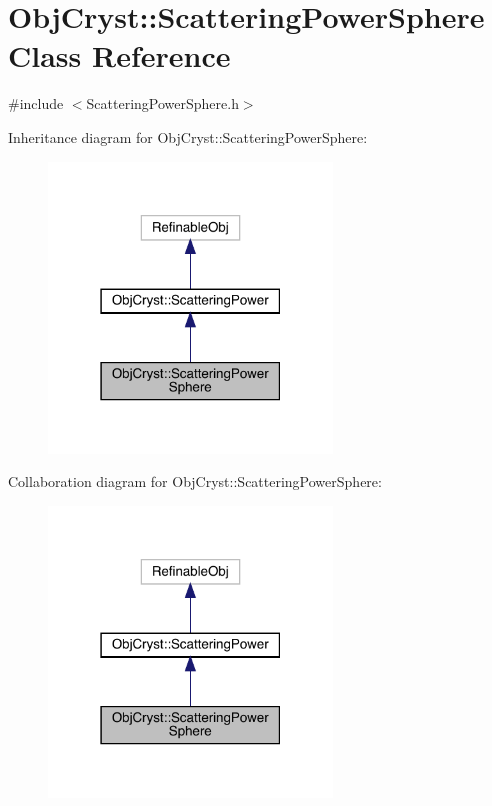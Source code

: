 \hypertarget{class_obj_cryst_1_1_scattering_power_sphere}{}\section{Obj\+Cryst\+::Scattering\+Power\+Sphere Class Reference}
\label{class_obj_cryst_1_1_scattering_power_sphere}


{\ttfamily \#include $<$Scattering\+Power\+Sphere.\+h$>$}



Inheritance diagram for Obj\+Cryst\+::Scattering\+Power\+Sphere\+:
\nopagebreak
\begin{figure}[H]
\begin{center}
\leavevmode
\includegraphics[width=214pt]{class_obj_cryst_1_1_scattering_power_sphere__inherit__graph}
\end{center}
\end{figure}


Collaboration diagram for Obj\+Cryst\+::Scattering\+Power\+Sphere\+:
\nopagebreak
\begin{figure}[H]
\begin{center}
\leavevmode
\includegraphics[width=214pt]{class_obj_cryst_1_1_scattering_power_sphere__coll__graph}
\end{center}
\end{figure}
